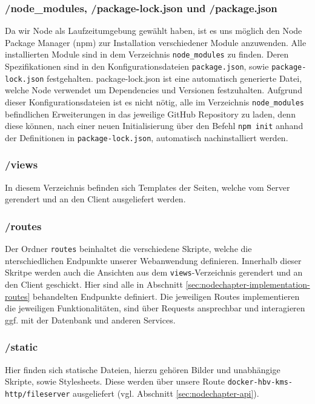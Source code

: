 \subsubsection*{/node\_modules, /package-lock.json und /package.json}
Da wir Node als Laufzeitumgebung gewählt haben, ist es uns möglich den Node Package Manager (npm) zur Installation verschiedener Module anzuwenden. Alle installierten Module sind in dem Verzeichnis \verb|node_modules| zu finden. Deren Spezifikationen sind in den Konfigurationsdateien \verb|package.json|, sowie \verb|package-lock.json| festgehalten. package-lock.json ist eine automatisch generierte Datei, welche Node verwendet um Dependencies und Versionen festzuhalten. Aufgrund dieser Konfigurationsdateien ist es nicht nötig, alle im Verzeichnis \verb|node_modules| befindlichen Erweiterungen in das jeweilige GitHub Repository zu laden, denn diese können, nach einer neuen Initialisierung über den Befehl \verb|npm init| anhand der Definitionen in \verb|package-lock.json|, automatisch nachinstalliert werden.

\subsubsection*{/views}
In diesem Verzeichnis befinden sich Templates der Seiten, welche vom Server gerendert und an den Client ausgeliefert werden.

\subsubsection*{/routes}
Der Ordner \verb|routes| beinhaltet die verschiedene Skripte, welche die  nterschiedlichen Endpunkte unserer Webanwendung definieren. Innerhalb dieser Skritpe werden auch die Ansichten aus dem \verb|views|-Verzeichnis gerendert und an den Client geschickt. Hier sind alle in Abschnitt \ref{sec:nodechapter-implementation-routes} behandelten Endpunkte definiert. Die jeweiligen Routes implementieren die jeweiligen Funktionalitäten, sind über Requests ansprechbar und interagieren ggf. mit der Datenbank und anderen Services.

\subsubsection*{/static}
Hier finden sich statische Dateien, hierzu gehören Bilder und unabhängige Skripte, sowie Stylesheets. Diese werden über unsere Route \verb|docker-hbv-kms-http/fileserver| ausgeliefert (vgl. Abschnitt \ref{sec:nodechapter-api}).


